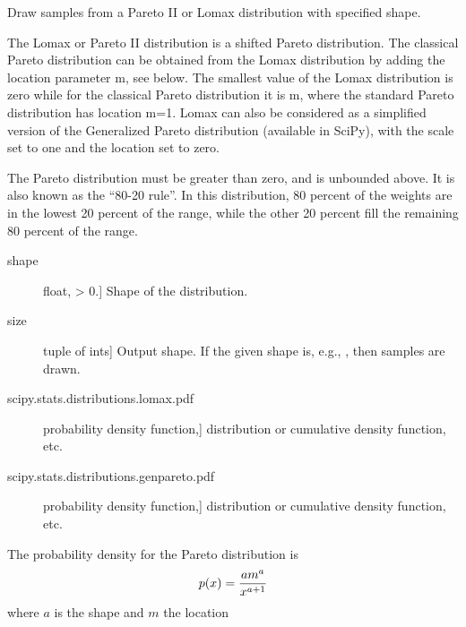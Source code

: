 \documentclass[letterpaper,10pt,english]{sphinxmanual}
\begin{document}
\begin{fulllineitems}
\end{fulllineitems}


\begin{fulllineitems}
\label{pygeomod:pygeomod.geomodeller_xml_obj.pareto}
Draw samples from a Pareto II or Lomax distribution with specified shape.

The Lomax or Pareto II distribution is a shifted Pareto distribution. The
classical Pareto distribution can be obtained from the Lomax distribution
by adding the location parameter m, see below. The smallest value of the
Lomax distribution is zero while for the classical Pareto distribution it
is m, where the standard Pareto distribution has location m=1.
Lomax can also be considered as a simplified version of the Generalized
Pareto distribution (available in SciPy), with the scale set to one and
the location set to zero.

The Pareto distribution must be greater than zero, and is unbounded above.
It is also known as the ``80-20 rule''.  In this distribution, 80 percent of
the weights are in the lowest 20 percent of the range, while the other 20
percent fill the remaining 80 percent of the range.
\begin{description}
\item[{shape}] \leavevmode{[}float, \textgreater{} 0.{]}
Shape of the distribution.

\item[{size}] \leavevmode{[}tuple of ints{]}
Output shape.  If the given shape is, e.g., , then
 samples are drawn.

\end{description}
\begin{description}
\item[{scipy.stats.distributions.lomax.pdf}] \leavevmode{[}probability density function,{]}
distribution or cumulative density function, etc.

\item[{scipy.stats.distributions.genpareto.pdf}] \leavevmode{[}probability density function,{]}
distribution or cumulative density function, etc.

\end{description}

The probability density for the Pareto distribution is
\begin{gather}
\begin{split}p(x) = \frac{am^a}{x^{a+1}}\end{split}\notag
\end{gather}
where \(a\) is the shape and \(m\) the location


\end{fulllineitems}
\end{document}
